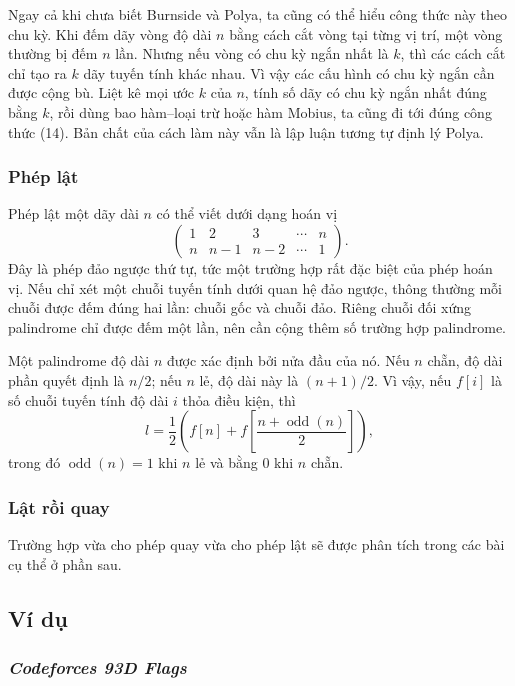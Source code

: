 \documentclass[11pt]{article}
\begin{document}
Ngay cả khi chưa biết Burnside và Polya, ta cũng có thể hiểu công thức này
theo chu kỳ. Khi đếm dãy vòng độ dài \(n\) bằng cách cắt vòng tại từng vị trí,
một vòng thường bị đếm \(n\) lần. Nhưng nếu vòng có chu kỳ ngắn nhất là \(k\),
thì các cách cắt chỉ tạo ra \(k\) dãy tuyến tính khác nhau. Vì vậy các cấu hình
có chu kỳ ngắn cần được cộng bù. Liệt kê mọi ước \(k\) của \(n\), tính số dãy
có chu kỳ ngắn nhất đúng bằng \(k\), rồi dùng bao hàm--loại trừ hoặc hàm
Mobius, ta cũng đi tới đúng công thức (14). Bản chất của cách làm này vẫn là
lập luận tương tự định lý Polya.

\subsubsection{Phép lật}

Phép lật một dãy dài \(n\) có thể viết dưới dạng hoán vị
\[
  \begin{pmatrix}
    1 & 2 & 3 & \cdots & n\\
    n & n-1 & n-2 & \cdots & 1
  \end{pmatrix}.
  \tag{15}
\]
Đây là phép đảo ngược thứ tự, tức một trường hợp rất đặc biệt của phép hoán
vị. Nếu chỉ xét một chuỗi tuyến tính dưới quan hệ đảo ngược, thông thường mỗi
chuỗi được đếm đúng hai lần: chuỗi gốc và chuỗi đảo. Riêng chuỗi đối xứng
palindrome chỉ được đếm một lần, nên cần cộng thêm số trường hợp palindrome.

Một palindrome độ dài \(n\) được xác định bởi nửa đầu của nó. Nếu \(n\) chẵn,
độ dài phần quyết định là \(n/2\); nếu \(n\) lẻ, độ dài này là \((n+1)/2\).
Vì vậy, nếu \(f[i]\) là số chuỗi tuyến tính độ dài \(i\) thỏa điều kiện, thì
\[
  l=\frac{1}{2}\left(f[n]+f\left[\frac{n+\operatorname{odd}(n)}{2}\right]\right),
  \tag{16}
\]
trong đó \(\operatorname{odd}(n)=1\) khi \(n\) lẻ và bằng \(0\) khi \(n\) chẵn.

\subsubsection{Lật rồi quay}

Trường hợp vừa cho phép quay vừa cho phép lật sẽ được phân tích trong các bài
cụ thể ở phần sau.

\subsection{Ví dụ}

\subsubsection{\emph{Codeforces 93D Flags}}
\end{document}

